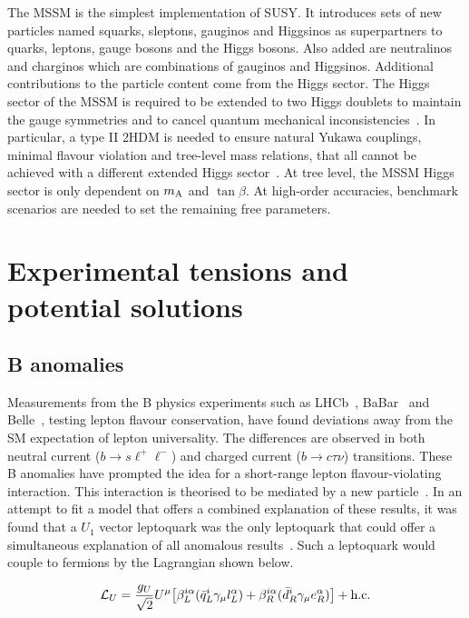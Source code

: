 The \ac{MSSM} is the simplest implementation of \ac{SUSY}.
It introduces sets of new particles named squarks, sleptons, gauginos and Higgsinos as superpartners to quarks, leptons, gauge bosons and the Higgs bosons.
Also added are neutralinos and charginos which are combinations of gauginos and Higgsinos.
Additional contributions to the particle content come from the Higgs sector.
The Higgs sector of the \ac{MSSM} is required to be extended to two Higgs doublets to maintain the gauge symmetries and to cancel quantum mechanical inconsistencies~\cite{SUSY_Primer}.
In particular, a type II \ac{2HDM} is needed to ensure natural Yukawa couplings, minimal flavour violation and tree-level mass relations, that all cannot be achieved with a different extended Higgs sector~\cite{SUSY_Primer}.
At tree level, the \ac{MSSM} Higgs sector is only dependent on $m_{{\text{A}}}$ and $\tan\beta$.
At high-order accuracies, benchmark scenarios are needed to set the remaining free parameters.

\section{Experimental tensions and potential solutions}

\subsection{B anomalies}
\label{sec:b_anomalies}

Measurements from the B physics experiments such as LHCb~\cite{LHCb:2021trn,LHCb:2015gmp,LHCb:2017rln,LHCb:2017smo}, BaBar~\cite{Kowalewski:2013mna,BaBar:2013mob} and Belle~\cite{Belle:2015qfa,Belle:2016dyj}, testing lepton flavour conservation, have found deviations away from the \ac{SM} expectation of lepton universality.
The differences are observed in both neutral current ($b\rightarrow s\ell^{+}\ell^{-}$) and charged current ($b\rightarrow c\tau\nu$) transitions.
These B anomalies have prompted the idea for a short-range lepton flavour-violating interaction.
This interaction is theorised to be mediated by a new  particle~\cite{Diaz:2017lit,Schmaltz:2018nls}.
In an attempt to fit a model that offers a combined explanation of these results, it was found that a $U_{1}$ vector leptoquark was the only leptoquark that could offer a simultaneous explanation of all anomalous results~\cite{Cornella:2021sby}. 
Such a leptoquark would couple to fermions by the Lagrangian shown below.

\begin{equation}
\mathcal{L}_{U} = \frac{g_{U}}{\sqrt{2}} U^{\mu} \big[ \beta_{L}^{i\alpha}( \bar{q}_{L}^{i} \gamma_{\mu} l_{L}^{\alpha}) + \beta_{R}^{i\alpha}( \bar{d}_{R}^{i} \gamma_{\mu} e_{R}^{\alpha}) \big] + \text{h.c.}
\end{equation}


